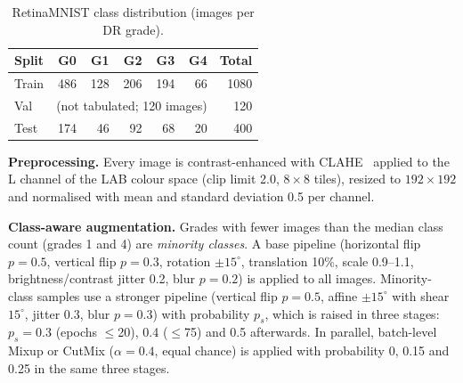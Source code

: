 \documentclass[10pt,twocolumn]{article}
\begin{document}
\begin{table}[t]
\centering\footnotesize
\caption{RetinaMNIST class distribution (images per DR grade).}\label{tab:data}
\begin{tabular}{lrrrrrr}
\toprule
Split & G0 & G1 & G2 & G3 & G4 & Total\\
\midrule
Train & 486 & 128 & 206 & 194 & 66 & 1080\\
Val   & \multicolumn{5}{c}{(not tabulated; 120 images)} & 120\\
Test  & 174 & 46 & 92 & 68 & 20 & 400\\
\bottomrule
\end{tabular}
\end{table}

\textbf{Preprocessing.} Every image is contrast-enhanced with CLAHE~\cite{clahe} applied to the L channel of the LAB colour space (clip limit 2.0, $8{\times}8$ tiles), resized to $192{\times}192$ and normalised with mean and standard deviation 0.5 per channel.

\textbf{Class-aware augmentation.} Grades with fewer images than the median class count (grades 1 and 4) are \emph{minority classes}. A base pipeline (horizontal flip $p{=}0.5$, vertical flip $p{=}0.3$, rotation $\pm15^\circ$, translation 10\%, scale 0.9--1.1, brightness/contrast jitter 0.2, blur $p{=}0.2$) is applied to all images. Minority-class samples use a stronger pipeline (vertical flip $p{=}0.5$, affine $\pm15^\circ$ with shear $15^\circ$, jitter 0.3, blur $p{=}0.3$) with probability $p_s$, which is raised in three stages: $p_s{=}0.3$ (epochs $\le$20), 0.4 ($\le$75) and 0.5 afterwards. In parallel, batch-level Mixup or CutMix ($\alpha{=}0.4$, equal chance) is applied with probability 0, 0.15 and 0.25 in the same three stages.

\end{document}
